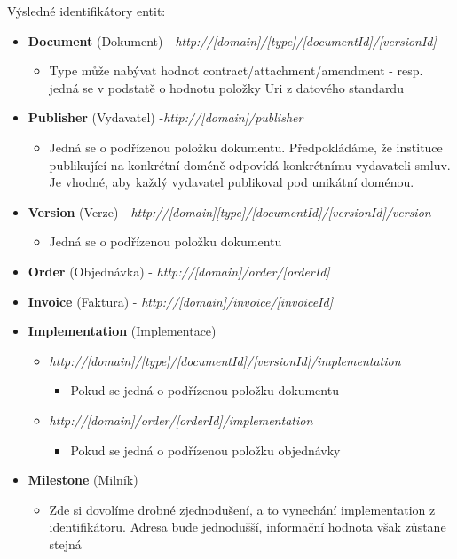 \medskip
\noindent
Výsledné identifikátory entit:

\begin{itemize}
\item \textbf{Document} (Dokument) - \textit{http://[domain]/[type]/[documentId]/[versionId]}
	\begin{itemize}
	\item Type může nabývat hodnot contract/attachment/amendment - resp. jedná se v podstatě o hodnotu položky Uri z datového standardu 
	\end{itemize}
\item \textbf{Publisher} (Vydavatel) -\textit{http://[domain]/publisher}
	\begin{itemize}
	\item Jedná se o podřízenou položku dokumentu. Předpokládáme, že instituce publikující na konkrétní doméně odpovídá konkrétnímu vydavateli smluv. Je vhodné, aby každý vydavatel publikoval pod unikátní doménou. 
	\end{itemize}
\item \textbf{Version} (Verze) - \textit{http://[domain][type]/[documentId]/[versionId]/version}
	\begin{itemize}
	\item Jedná se o podřízenou položku dokumentu 
	\end{itemize}
\item \textbf{Order} (Objednávka) - \textit{http://[domain]/order/[orderId]}
\item \textbf{Invoice} (Faktura) - \textit{http://[domain]/invoice/[invoiceId]}
\item \textbf{Implementation} (Implementace)
	\begin{itemize}
	\item \textit{http://[domain]/[type]/[documentId]/[versionId]/implementation}
		\begin{itemize}
		\item Pokud se jedná o podřízenou položku dokumentu
		\end{itemize}
	\item \textit{http://[domain]/order/[orderId]/implementation}
		\begin{itemize}
		\item Pokud se jedná o  podřízenou položku objednávky
		\end{itemize}
	\end{itemize}
\item \textbf{Milestone} (Milník) 
\begin{itemize}
	\item Zde si dovolíme drobné zjednodušení, a to vynechání implementation z identifikátoru. Adresa bude jednodušší, informační hodnota však zůstane stejná

\end{itemize}
\end{itemize}
